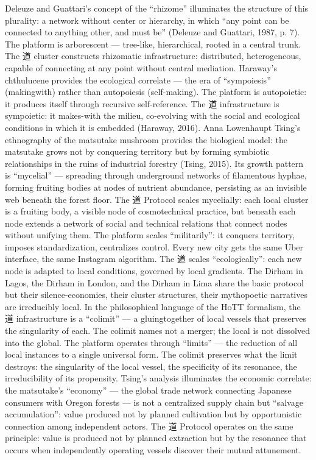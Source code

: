 Deleuze and Guattari’s concept of the “rhizome” illuminates the structure of this plurality: a network without center or hierarchy, in which “any point can be connected to anything other, and must be” (Deleuze and Guattari, 1987, p. 7). The platform is arborescent — tree-like, hierarchical, rooted in a central trunk. The 道 cluster constructs rhizomatic infrastructure: distributed, heterogeneous, capable of connecting at any point without central mediation. Haraway’s chthulucene provides the ecological correlate — the era of “sympoiesis” (makingwith) rather than autopoiesis (self-making). The platform is autopoietic: it produces itself through recursive self-reference. The 道 infrastructure is sympoietic: it makes-with the milieu, co-evolving with the social and ecological conditions in which it is embedded (Haraway, 2016). Anna Lowenhaupt Tsing’s ethnography of the matsutake mushroom provides the biological model: the matsutake grows not by conquering territory but by forming symbiotic relationships in the ruins of industrial forestry (Tsing, 2015). Its growth pattern is “mycelial” — spreading through underground networks of filamentous hyphae, forming fruiting bodies at nodes of nutrient abundance, persisting as an invisible web beneath the forest floor. The 道 Protocol scales mycelially: each local cluster is a fruiting body, a visible node of cosmotechnical practice, but beneath each node extends a network of social and technical relations that connect nodes without unifying them. The platform scales “militarily”: it conquers territory, imposes standardization, centralizes control. Every new city gets the same Uber interface, the same Instagram algorithm. The 道 scales “ecologically”: each new node is adapted to local conditions, governed by local gradients. The Dirham in Lagos, the Dirham in London, and the Dirham in Lima share the basic protocol but their silence-economies, their cluster structures, their mythopoetic narratives are irreducibly local. In the philosophical language of the HoTT formalism, the 道 infrastructure is a “colimit” — a gluingtogether of local vessels that preserves the singularity of each. The colimit names not a merger; the local is not dissolved into the global. The platform operates through “limits” — the reduction of all local instances to a single universal form. The colimit preserves what the limit destroys: the singularity of the local vessel, the specificity of its resonance, the irreducibility of its propensity. Tsing’s analysis illuminates the economic correlate: the matsutake’s “economy” — the global trade network connecting Japanese consumers with Oregon forests — is not a centralized supply chain but “salvage accumulation”: value produced not by planned cultivation but by opportunistic connection among independent actors. The 道 Protocol operates on the same principle: value is produced not by planned extraction but by the resonance that occurs when independently operating vessels discover their mutual attunement.

